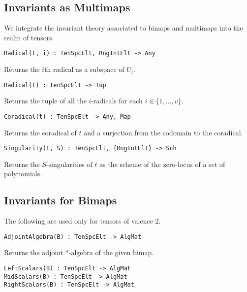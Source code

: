 \documentclass{amsart}
\begin{document}
\subsection{Invariants as Multimaps}

We integrate the invariant theory associated to bimaps and multimaps into the 
realm of tensors. 

\color{blue}
{\small \begin{verbatim}
Radical(t, i) : TenSpcElt, RngIntElt -> Any
\end{verbatim} }
\color{black}

Returns the $i$th radical as a subspace of $U_i$. 

\color{blue}
{\small \begin{verbatim}
Radical(t) : TenSpcElt -> Tup
\end{verbatim} }
\color{black}

Returns the tuple of all the $i$-radicals for each $i\in \{1,...,v\}$.

\color{blue}
{\small \begin{verbatim}
Coradical(t) : TenSpcElt -> Any, Map
\end{verbatim} }
\color{black}

Returns the coradical of $t$ and a surjection from the codomain to the 
coradical.

\color{blue}
{\small \begin{verbatim}
Singularity(t, S) : TenSpcElt, {RngIntElt} -> Sch
\end{verbatim} }
\color{black}

Returns the $S$-singularities of $t$ as the scheme of the zero-locus of a set of
polynomials.

\subsection{Invariants for Bimaps}

The following are used only for tensors of valence 2.

\color{blue}
{\small \begin{verbatim}
AdjointAlgebra(B) : TenSpcElt -> AlgMat
\end{verbatim} }
\color{black}

Returns the adjoint $*$-algebra of the given bimap. 

\color{blue}
  
{\small \begin{verbatim}
LeftScalars(B) : TenSpcElt -> AlgMat
MidScalars(B) : TenSpcElt -> AlgMat
RightScalars(B) : TenSpcElt -> AlgMat
\end{verbatim} }
\color{black}
\end{document}

